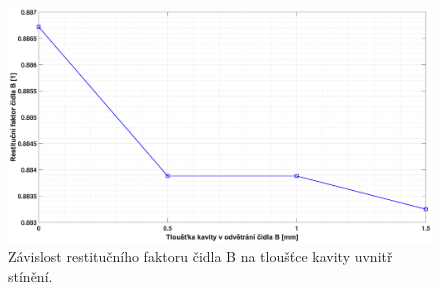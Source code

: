             \begin{figure}[ht!]
                \centering
                \includegraphics*[width=\textwidth, trim={5.0cm 1.0cm 5.8cm 2.0cm}]{400_SIMULACE_KONSTRUKCNICH_UPRAV/Grafy/kavita_B.eps}
                \caption{Závislost restitučního faktoru čidla B na tloušťce kavity uvnitř stínění.}
                \label{fig:kavita-B-graf}
            \end{figure}
    